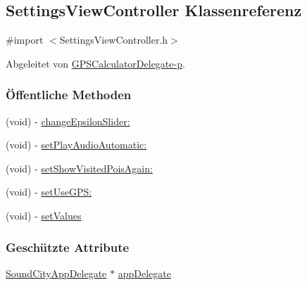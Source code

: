 \hypertarget{interface_settings_view_controller}{
\subsection{SettingsViewController Klassenreferenz}
\label{interface_settings_view_controller}
}


{\ttfamily \#import $<$SettingsViewController.h$>$}

Abgeleitet von \hyperlink{protocol_g_p_s_calculator_delegate-p}{GPSCalculatorDelegate-\/p}.\subsubsection*{Öffentliche Methoden}
\begin{DoxyCompactItemize}
\item 
(void) -\/ \hyperlink{interface_settings_view_controller_a1666ba6a7424d34f67afbcd5be605efc}{changeEpsilonSlider:}
\item 
(void) -\/ \hyperlink{interface_settings_view_controller_a875f63db279319a3f72d4b078eddabcc}{setPlayAudioAutomatic:}
\item 
(void) -\/ \hyperlink{interface_settings_view_controller_addbc1a6780c2787fb5af8f8cfcab6cad}{setShowVisitedPoisAgain:}
\item 
(void) -\/ \hyperlink{interface_settings_view_controller_a9bfcf40bc1e8ccefa7af46b38ad974fc}{setUseGPS:}
\item 
(void) -\/ \hyperlink{interface_settings_view_controller_aced3c8535b61eb78231acf987570cd48}{setValues}
\end{DoxyCompactItemize}
\subsubsection*{Geschützte Attribute}
\begin{DoxyCompactItemize}
\item 
\hyperlink{interface_sound_city_app_delegate}{SoundCityAppDelegate} $\ast$ \hyperlink{interface_settings_view_controller_a55c58e84759317a7d8940b947f6eee99}{appDelegate}
\end{DoxyCompactItemize}
